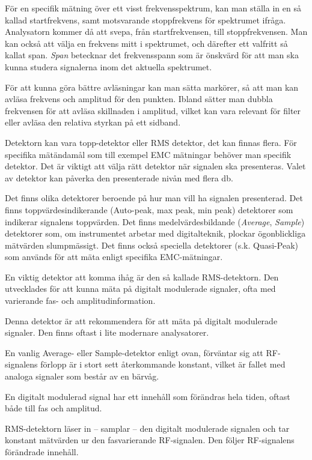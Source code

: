 För en specifik mätning över ett visst frekvensspektrum, kan man ställa in en
så kallad startfrekvens, samt motsvarande stoppfrekvens för spektrumet ifråga.
Analysatorn kommer då att svepa, från startfrekvensen, till stoppfrekvensen.
Man kan också att välja en frekvens mitt i spektrumet, och därefter ett
valfritt så kallat span.
\emph{Span} betecknar det frekvensspann som är önskvärd för att man ska
kunna studera signalerna inom det aktuella spektrumet.

För att kunna göra bättre avläsningar kan man sätta markörer, så att man kan
avläsa frekvens och amplitud för den punkten.
Ibland sätter man dubbla frekvensen för att avläsa skillnaden i amplitud,
vilket kan vara relevant för filter eller avläsa den relativa styrkan på ett
sidband.

Detektorn kan vara topp-detektor eller RMS detektor, det kan finnas flera.
För specifika mätändamål som till exempel EMC mätningar behöver man specifik detektor.
Det är viktigt att välja rätt detektor när signalen ska presenteras.
Valet av detektor kan påverka den presenterade nivån med flera \unit{\decibel}.

Det finns olika detektorer beroende på hur man vill ha signalen presenterad.
Det finns toppvärdesindikerande (Auto-peak, max peak, min peak) detektorer som
indikerar signalens toppvärden.
Det finns medelvärdesbildande (\emph{Average}, \emph{Sample}) detektorer som, om
instrumentet arbetar med digitalteknik, plockar ögonblickliga mätvärden
slumpmässigt.
Det finns också speciella detektorer (s.k. Quasi-Peak) som används för att
mäta enligt specifika EMC-mätningar.

En viktig detektor att komma ihåg är den så kallade RMS-detektorn.
Den utvecklades för att kunna mäta på digitalt modulerade signaler, ofta med
varierande fas- och amplitudinformation.

Denna detektor är att rekommendera för att mäta på digitalt modulerade signaler.
Den finns oftast i lite modernare analysatorer.

En vanlig Average- eller Sample-detektor enligt ovan, förväntar sig att
RF-signalens förlopp är  i stort sett återkommande konstant, vilket är fallet
med analoga signaler som består av en bärvåg.

En digitalt modulerad signal har ett innehåll som förändras hela tiden, oftast
både till fas och amplitud.

RMS-detektorn läser in -- samplar -- den digitalt modulerade signalen och tar
konstant mätvärden ur den fasvarierande RF-signalen.
Den följer RF-signalens förändrade innehåll.

